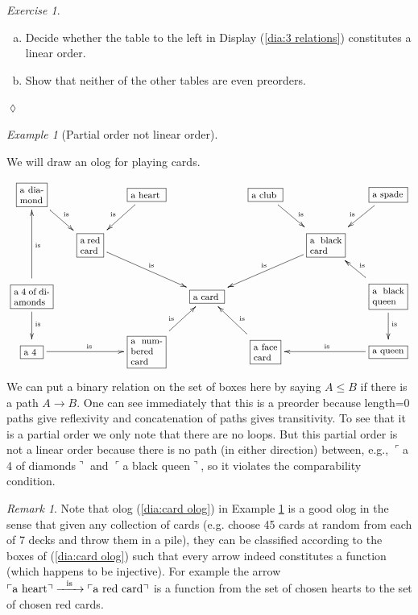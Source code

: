 \documentclass{book}
\def\tn{\textnormal}
\def\to{\rightarrow}
\newcommand{\obox}[3]{\stackrel{#1}{\fbox{\parbox{#2}{#3}}}}
\newcommand{\fakebox}[1]{\tn{$\ulcorner$#1$\urcorner$}}
\newcommand{\Too}[1]{\xrightarrow{\ \ #1\ \ }}
\theoremstyle{remark}
\newtheorem{remark}[subsubsection]{Remark}
\newtheorem{example}[subsubsection]{Example}
\newtheorem{exc}[subsubsection]{Exercise}
\newenvironment{exercise}{\begin{exc}}{\hspace*{\fill}$\lozenge$\end{exc}}
\theoremstyle{definition}
\def\sexc{\begin{enumerate}[a.)]\setlength{\itemsep}{.1cm}\setlength{\parskip}{.1cm}\item}
\def\next{\item}
\def\endsexc{\end{enumerate}}
\begin{document}
\begin{exercise}~
\sexc Decide whether the table to the left in Display (\ref{dia:3 relations}) constitutes a linear order. 
\next Show that neither of the other tables are even preorders.
\endsexc
\end{exercise}

\begin{example}[Partial order not linear order]\label{ex:pre not par}

We will draw an olog for playing cards. 
\begin{align}\label{dia:card olog}
\footnotesize
\xymatrixnocompile@=15pt{
\obox{}{.3in}{a diamond}\ar[dr]^{\tn{is}}&&\obox{}{.4in}{a heart}\ar[dl]_{\tn{is}}&&\obox{}{.35in}{a club}\ar[dr]^{\tn{is}}&&\obox{}{.4in}{a spade}\ar[dl]_{\tn{is}}\\
&\obox{}{.25in}{a red card}\ar[drr]^{\tn{is}}&&&&\obox{}{.4in}{a black card}\ar[dll]_{\tn{is}}\\
\obox{}{.45in}{a 4 of diamonds}\ar[d]^{\tn{is}}\ar[uu]_{\tn{is}}&&&\obox{}{.35in}{a card}&&&\obox{}{.4in}{a black queen}\ar[d]^{\tn{is}}\ar[ul]_{\tn{is}}\\
\obox{}{.2in}{a 4}\ar[rr]^{\tn{is}}&&\obox{}{.4in}{a numbered card}\ar[ur]^{\tn{is}}&&\obox{}{.3in}{a face card}\ar[ul]_{\tn{is}}&&\obox{}{.4in}{a queen}\ar[ll]_{\tn{is}}
}
\end{align}
We can put a binary relation on the set of boxes here by saying $A\leq B$ if there is a path $A\to B$. One can see immediately that this is a preorder because length=0 paths give reflexivity and concatenation of paths gives transitivity. To see that it is a partial order we only note that there are no loops. But this partial order is not a linear order because there is no path (in either direction) between, e.g., \fakebox{a 4 of diamonds} and \fakebox{a black queen}, so it violates the comparability condition.

\end{example}

\begin{remark}

Note that olog (\ref{dia:card olog}) in Example \ref{ex:pre not par} is a good olog in the sense that given any collection of cards (e.g. choose 45 cards at random from each of 7 decks and throw them in a pile), they can be classified according to the boxes of (\ref{dia:card olog}) such that every arrow indeed constitutes a function (which happens to be injective). For example the arrow $\fakebox{a heart}\Too{\tn{is}}\fakebox{a red card}$ is a function from the set of chosen hearts to the set of chosen red cards.

\end{remark}
\end{document}
